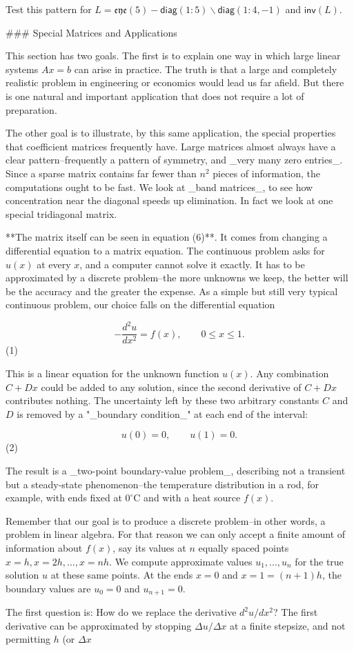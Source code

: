 Test this pattern for \(L=\mathfrak{eye}(5)-\mathsf{diag}(1\!:\!5)\backslash\mathsf{diag}(1\!:\!4,-1)\) and \(\mathsf{inv}(L)\).

### Special Matrices and Applications

This section has two goals. The first is to explain one way in which large linear systems \(Ax=b\) can arise in practice. The truth is that a large and completely realistic problem in engineering or economics would lead us far afield. But there is one natural and important application that does not require a lot of preparation.

The other goal is to illustrate, by this same application, the special properties that coefficient matrices frequently have. Large matrices almost always have a clear pattern--frequently a pattern of symmetry, and _very many zero entries_. Since a sparse matrix contains far fewer than \(n^{2}\) pieces of information, the computations ought to be fast. We look at _band matrices_, to see how concentration near the diagonal speeds up elimination. In fact we look at one special tridiagonal matrix.

**The matrix itself can be seen in equation (6)**. It comes from changing a differential equation to a matrix equation. The continuous problem asks for \(u(x)\) at every \(x\), and a computer cannot solve it exactly. It has to be approximated by a discrete problem--the more unknowns we keep, the better will be the accuracy and the greater the expense. As a simple but still very typical continuous problem, our choice falls on the differential equation

\[-\frac{d^{2}u}{dx^{2}}=f(x),\qquad 0\leq x\leq 1.\] (1)

This is a linear equation for the unknown function \(u(x)\). Any combination \(C+Dx\) could be added to any solution, since the second derivative of \(C+Dx\) contributes nothing. The uncertainty left by these two arbitrary constants \(C\) and \(D\) is removed by a "_boundary condition_" at each end of the interval:

\[u(0)=0,\qquad u(1)=0.\] (2)

The result is a _two-point boundary-value problem_, describing not a transient but a steady-state phenomenon--the temperature distribution in a rod, for example, with ends fixed at \(0^{\circ}\mathrm{C}\) and with a heat source \(f(x)\).

Remember that our goal is to produce a discrete problem--in other words, a problem in linear algebra. For that reason we can only accept a finite amount of information about \(f(x)\), say its values at \(n\) equally spaced points \(x=h,x=2h,\ldots,x=nh\). We compute approximate values \(u_{1},\ldots,u_{n}\) for the true solution \(u\) at these same points. At the ends \(x=0\) and \(x=1=(n+1)h\), the boundary values are \(u_{0}=0\) and \(u_{n+1}=0\).

The first question is: How do we replace the derivative \(d^{2}u/dx^{2}\)? The first derivative can be approximated by stopping \(\Delta u/\Delta x\) at a finite stepsize, and not permitting \(h\) (or \(\Delta x\) 